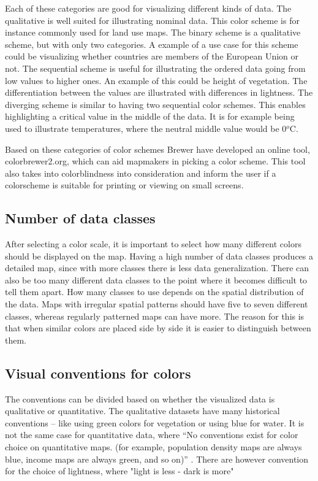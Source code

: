 Each of these categories are good for visualizing different kinds of data. The qualitative is well suited for illustrating nominal data. This color scheme is for instance commonly used for land use maps. The binary scheme is a qualitative scheme, but with only two categories. A example of a use case for this scheme could be visualizing whether countries are members of the European Union or not. 
The sequential scheme is useful for illustrating the ordered data going from low values to higher ones. An example of this could be height of vegetation. The differentiation between the values are illustrated with differences in lightness.
The diverging scheme is similar to having two sequential color schemes. This enables highlighting a critical value in the middle of the data. It is for example being used to illustrate temperatures, where the neutral middle value would be 0$^o$C. \citep{Brewer94}


Based on these categories of color schemes Brewer have developed an online tool, colorbrewer2.org, which can aid mapmakers in picking a color scheme. This tool also takes into colorblindness into consideration and inform the user if a colorscheme is suitable for printing or viewing on small screens. \citep{ColorBrewer}

\subsection{Number of data classes}
After selecting a color scale, it is important to select how many different colors should be displayed on the map. Having a high number of data classes produces a detailed map, since with more classes there is less data generalization. There can also be too many different data classes to the point where it becomes difficult to tell them apart. 
How many classes to use depends on the spatial distribution of the data. Maps with irregular spatial patterns should have five to seven different classes, whereas regularly patterned maps can have more. The reason for this is that when similar colors are placed side by side it is easier to distinguish between them.\citep{ColorBrewer}

\subsection{Visual conventions for colors}
The conventions can be divided based on whether the visualized data is qualitative or quantitative. The qualitative datasets have many historical conventions – like using green colors for vegetation or using blue for water. 
It is not the same case for quantitative data, where “No conventions exist for color choice on quantitative maps. (for example, population density maps are always blue, income maps are always green, and so on)” \citep{Dent}. There are however convention for the choice of lightness, where "light is less - dark is more"


